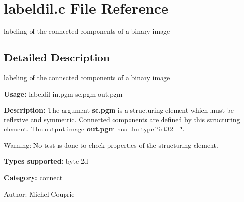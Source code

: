 \section{labeldil.c File Reference}
\label{labeldil_8c}
labeling of the connected components of a binary image  




\label{_details}
\subsection{Detailed Description}
labeling of the connected components of a binary image 

{\bf Usage:} labeldil in.pgm se.pgm out.pgm

{\bf Description:} The argument {\bf se.pgm} is a structuring element which must be reflexive and symmetric. Connected components are defined by this structuring element. The output image {\bf out.pgm} has the type \char`\"{}int32\_\-t\char`\"{}.

\begin{Desc}
\item[Warning:]No test is done to check properties of the structuring element.\end{Desc}
{\bf Types supported:} byte 2d

{\bf Category:} connect

\begin{Desc}
\item[Author:]Michel Couprie \end{Desc}
